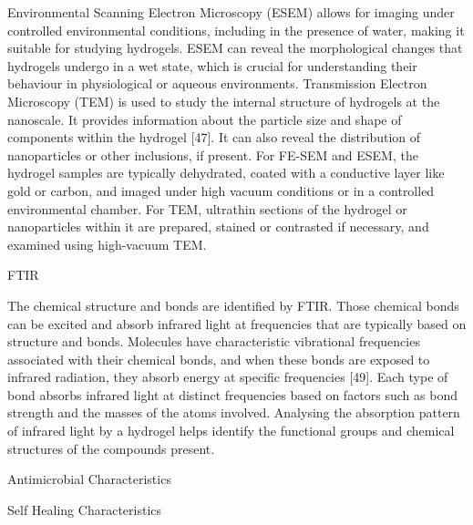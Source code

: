 \documentclass[../../main-notes.tex]{subfiles}
\begin{document}
Environmental Scanning Electron Microscopy (ESEM) allows for imaging under controlled environmental conditions, including in the presence of water, making it suitable for studying hydrogels. 
ESEM can reveal the morphological changes that hydrogels undergo in a wet state, which is crucial for understanding their behaviour in physiological or aqueous environments. 
Transmission Electron Microscopy (TEM) is used to study the internal structure of hydrogels at the nanoscale.
It provides information about the particle size and shape of components within the hydrogel [47]. 
It can also reveal the distribution of nanoparticles or other inclusions, if present. For FE-SEM and ESEM, the hydrogel samples are typically dehydrated, coated with a conductive layer like gold or carbon, and imaged under high vacuum conditions or in a controlled environmental chamber. 
For TEM, ultrathin sections of the hydrogel or nanoparticles within it are prepared, stained or contrasted if necessary, and examined using high-vacuum TEM.




FTIR


The chemical structure and bonds are identified by FTIR. 
Those chemical bonds can be excited and absorb infrared light at frequencies that are typically based on structure and bonds.
Molecules have characteristic vibrational frequencies associated with their chemical bonds, and when these bonds are exposed to infrared radiation, they absorb energy at specific frequencies [49]. 
Each type of bond absorbs infrared light at distinct frequencies based on factors such as bond strength and the masses of the atoms involved. 
Analysing the absorption pattern of infrared light by a hydrogel helps identify the functional groups and chemical structures of the compounds present.







Antimicrobial Characteristics 

Self Healing Characteristics 
\end{document}
